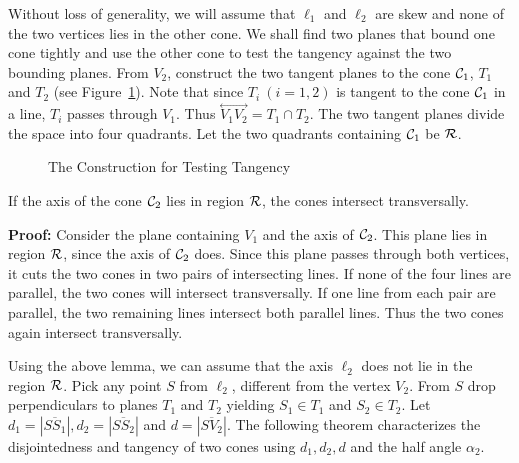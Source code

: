     Without loss of generality, we will assume that $\ell_1$ and $\ell_2$ are 
skew and none of the two 
vertices lies in the other cone.  We shall find two planes that bound one cone
tightly and use the other cone to test the tangency against the two bounding 
planes.  From $V_2$, construct the two tangent planes to the cone 
${\cal C}_1$, $T_1$ and $T_2$ (see Figure~\ref{fig:cone-tangent}).  Note that 
since $T_i\ (i=1,2)$ is tangent to the cone ${\cal C}_1$ in a line, $T_i$ 
passes through $V_1$.  Thus $\stackrel{\longleftrightarrow}{V_1V_2}
=T_1\cap T_2$.  The two tangent planes divide the space into four quadrants.
Let the two quadrants containing ${\cal C}_1$ be ${\cal R}$.
\begin{figure}
\vspace{6cm}
\caption{The Construction for Testing Tangency}
\label{fig:cone-tangent}
\end{figure}

\begin{lemma}
\label{lemma:cone-in-region}
     If the axis of the cone ${\cal C}_2$ lies in region ${\cal R}$, the cones
intersect transversally.
\end{lemma}
{\bf Proof:}  Consider the plane containing $V_1$ and the axis of ${\cal C}_2$.
This plane lies in region ${\cal R}$, since the axis of ${\cal C}_2$ does.
Since this plane passes through both vertices, it cuts the two cones
in two pairs of intersecting lines.  If none of the four lines are parallel,
the two cones will intersect transversally.  If one line from each pair are 
parallel, the two remaining lines intersect both parallel lines.  Thus the 
two cones again intersect transversally.\ \ \ \QED

     Using the above lemma, we can assume that the axis $\ell_2$ does not lie 
in the region ${\cal R}$.  Pick any point $S$ from $\ell_2$, 
different from the vertex $V_2$.  From $S$ drop perpendiculars to planes $T_1$
and $T_2$ yielding $S_1\in T_1$ and $S_2\in T_2$.  Let $d_1=|\overline{SS_1}|,
d_2=|\overline{SS_2}|$ and $d=|\overline{SV_2}|$.  The following theorem 
characterizes the disjointedness and tangency of two cones using $d_1,d_2,d$ 
and the half angle $\alpha_2$.

